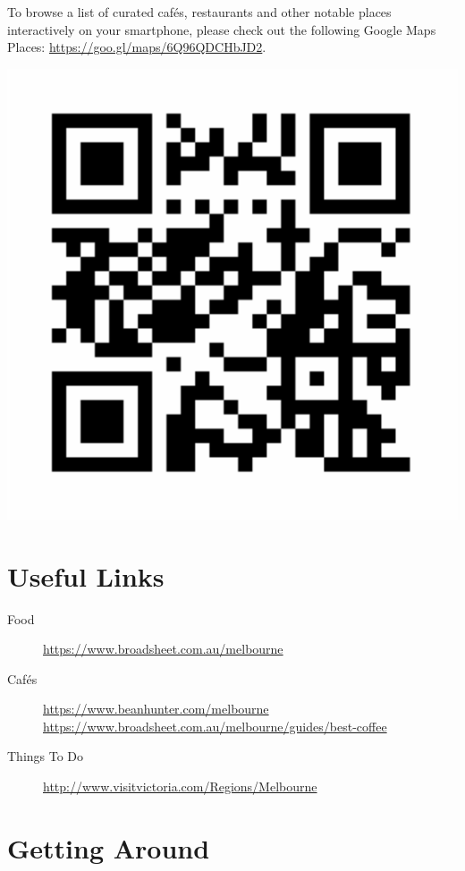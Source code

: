 To browse a list of curated caf{\'e}s, restaurants and other notable places interactively on your smartphone, please check out the following Google Maps Places: \url{https://goo.gl/maps/6Q96QDCHbJD2}.
\vspace*{-0.4cm}
\begin{center}
\includegraphics[scale=0.14]{content/local-guide/gmaps.pdf}
\end{center}

\section*{Useful Links}
\vspace*{-1em}

\begin{description}
\item[Food] \url{https://www.broadsheet.com.au/melbourne}
\item[Caf{\'e}s] \url{https://www.beanhunter.com/melbourne} \\
\url{https://www.broadsheet.com.au/melbourne/guides/best-coffee}
\item[Things To Do] \url{http://www.visitvictoria.com/Regions/Melbourne}
\end{description}

\section*{Getting Around}

